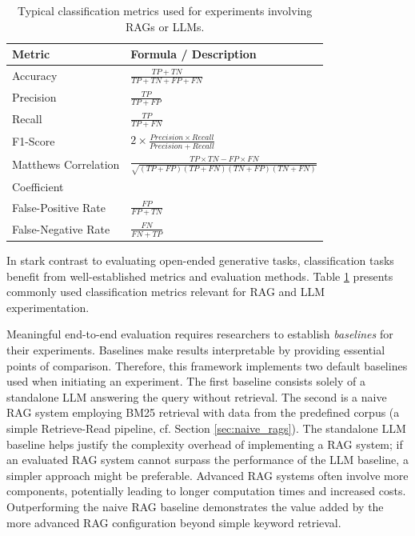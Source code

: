 {\renewcommand{\arraystretch}{1.5}%
\begin{table}
  \centering
 \begin{tabular}{|l|l|}
  \hline
  \textbf{Metric} & \textbf{Formula / Description} \\[3pt]
  \hline Accuracy & $\frac{TP + TN}{TP + TN + FP + FN}$\\[5pt]
  \hline Precision & $\frac{TP}{TP + FP}$\\[5pt]
  \hline Recall & $\frac{TP}{TP + FN}$\\[2pt]
  \hline F1-Score & $2 \times \frac{Precision \times Recall}{Precision + Recall}$\\[2pt]
  \hline Matthews Correlation & $\frac{TP \times TN - FP \times FN}{\sqrt{(TP + FP)(TP + FN)(TN + FP)(TN + FN)}}$\\Coefficient & \\[2pt]
  \hline False-Positive Rate & $\frac{FP}{FP + TN}$\\[2pt]
  \hline False-Negative Rate & $\frac{FN}{FN + TP}$\\[2pt]
  \hline
 \end{tabular}
 \caption{Typical classification metrics used for experiments involving RAGs or LLMs\cite{Hou.8212023,Zeng.28.03.2024}.}
 \label{table:classification_metrics}
\end{table}}

In stark contrast to evaluating open-ended generative tasks, classification tasks benefit from well-established metrics and evaluation methods. Table \ref{table:classification_metrics} presents commonly used classification metrics relevant for RAG and LLM experimentation.

Meaningful end-to-end evaluation requires researchers to establish \textit{baselines} for their experiments. Baselines make results interpretable by providing essential points of comparison. Therefore, this framework implements two default baselines used when initiating an experiment. The first baseline consists solely of a standalone LLM answering the query without retrieval. The second is a naive RAG system employing BM25 retrieval with data from the predefined corpus (a simple Retrieve-Read pipeline, cf. Section \ref{sec:naive_rags}). The standalone LLM baseline helps justify the complexity overhead of implementing a RAG system; if an evaluated RAG system cannot surpass the performance of the LLM baseline, a simpler approach might be preferable. Advanced RAG systems often involve more components, potentially leading to longer computation times and increased costs. Outperforming the naive RAG baseline demonstrates the value added by the more advanced RAG configuration beyond simple keyword retrieval.

